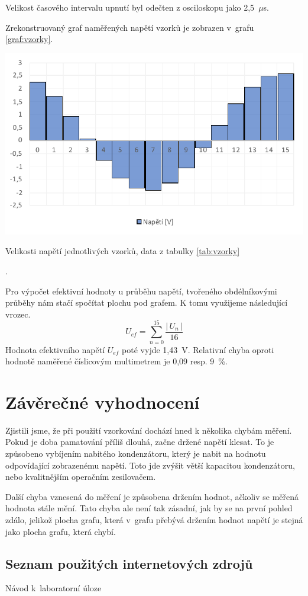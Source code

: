 \documentclass[a4paper,12pt]{article}   %
\newcommand{\tmu}{$\mu$}
\begin{document}
Velikost časového intervalu upnutí byl odečten z osciloskopu jako 2,5~\tmu s.

Zrekonstruovaný graf naměřených napětí vzorků je zobrazen v~grafu \ref{graf:vzorky}.

\begin{graf}
  \centering
  \includegraphics[width=.8\textwidth]{graf_vzorky.pdf}
  \caption{Velikosti napětí jednotlivých vzorků, data z tabulky \ref{tab:vzorky}}
  \label{graf:vzorky}
\end{graf}.

Pro výpočet efektivní hodnoty u průběhu napětí, tvořeného obdélníkovými průběhy nám stačí spočítat plochu pod grafem. K tomu využijeme následující vrozec.
\begin{equation}
  U_{ef} = \sum_{n=0}^{15} \frac{|\,U_n\,|}{16}
\end{equation}
Hodnota efektivního napětí $U_{ef}$ poté vyjde 1,43~V. Relativní chyba oproti hodnotě naměřené číslicovým multimetrem je 0,09 resp. 9~\%.


\section{Závěrečné vyhodnocení}
\label{chap:zaver}
Zjistili jsme, že při použití vzorkování dochází hned k několika chybám měření. Pokud je doba pamatování příliš dlouhá, začne držené napětí klesat. To je způsobeno vybíjením nabitého kondenzátoru, který je nabit na hodnotu odpovídající zobrazenému napětí. Toto jde zvýšit větší kapacitou kondenzátoru, nebo kvalitnějším operačním zesilovačem.

Další chyba vznesená do měření je způsobena držením hodnot, ačkoliv se měřená hodnota stále mění. Tato chyba ale není tak zásadní, jak by se na první pohled zdálo, jelikož plocha grafu, která v~grafu přebývá držením hodnot napětí je stejná jako plocha grafu, která chybí.


\clearpage
\renewcommand{\refname}{Seznam použité literatury a~zdrojů informací} 

\begin{thebibliography}{99}

\subsection*{Seznam použitých internetových zdrojů}
     Návod k~laboratorní úloze
    
\end{thebibliography}
\end{document}
